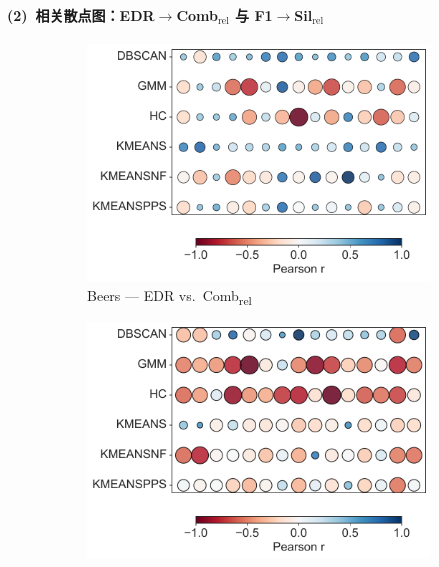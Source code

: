 \documentclass[10pt]{article} %
\numberwithin{equation}{section}
\begin{document}
\paragraph{(2)~相关散点图：EDR\(\rightarrow\)Comb\(_{\text{rel}}\) 与 F1\(\rightarrow\)Sil\(_{\text{rel}}\)}\par
\begin{figure}[htbp]  %
  \centering
  \begin{subfigure}[b]{0.33\linewidth}
    \includegraphics[width=\linewidth]{figures/6.4.3graph/BE_EDR_vs_Comb_relative.pdf}
    \caption{Beers — EDR vs.\ Comb\textsubscript{rel}}
    \label{fig:be_edr_comb}
  \end{subfigure}\hfill
  \begin{subfigure}[b]{0.33\linewidth}
    \includegraphics[width=\linewidth]{figures/6.4.3graph/BE_F1_vs_Sil_relative.pdf}

\end{subfigure}
\end{figure}
\end{document}
